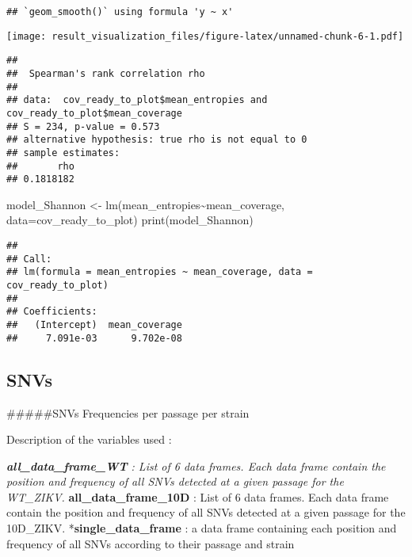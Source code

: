 \documentclass[
]{article}
\newenvironment{Shaded}{\begin{snugshade}}{\end{snugshade}}
\newcommand{\AttributeTok}[1]{\textcolor[rgb]{0.77,0.63,0.00}{#1}}
\newcommand{\FunctionTok}[1]{\textcolor[rgb]{0.00,0.00,0.00}{#1}}
\newcommand{\NormalTok}[1]{#1}
\newcommand{\OtherTok}[1]{\textcolor[rgb]{0.56,0.35,0.01}{#1}}
\newcommand{\SpecialCharTok}[1]{\textcolor[rgb]{0.00,0.00,0.00}{#1}}
\newcommand{\StringTok}[1]{\textcolor[rgb]{0.31,0.60,0.02}{#1}}
\begin{document}
\begin{verbatim}
## `geom_smooth()` using formula 'y ~ x'
\end{verbatim}

\texttt{[image: result\_visualization\_files/figure-latex/unnamed-chunk-6-1.pdf]}

\begin{Shaded}
\end{Shaded}

\begin{verbatim}
## 
##  Spearman's rank correlation rho
## 
## data:  cov_ready_to_plot$mean_entropies and cov_ready_to_plot$mean_coverage
## S = 234, p-value = 0.573
## alternative hypothesis: true rho is not equal to 0
## sample estimates:
##       rho 
## 0.1818182
\end{verbatim}

\begin{Shaded}
\begin{Highlighting}[]
\NormalTok{model\_Shannon }\OtherTok{\textless{}{-}} \FunctionTok{lm}\NormalTok{(mean\_entropies}\SpecialCharTok{\textasciitilde{}}\NormalTok{mean\_coverage, }\AttributeTok{data=}\NormalTok{cov\_ready\_to\_plot)}
\FunctionTok{print}\NormalTok{(model\_Shannon)}
\end{Highlighting}
\end{Shaded}

\begin{verbatim}
## 
## Call:
## lm(formula = mean_entropies ~ mean_coverage, data = cov_ready_to_plot)
## 
## Coefficients:
##   (Intercept)  mean_coverage  
##     7.091e-03      9.702e-08
\end{verbatim}

\hypertarget{snvs}{%
\subsection{SNVs}\label{snvs}}

\#\#\#\#\#SNVs Frequencies per passage per strain

Description of the variables used :

\emph{\textbf{all\_data\_frame\_WT} : List of 6 data frames. Each data
frame contain the position and frequency of all SNVs detected at a given
passage for the WT\_ZIKV. }\textbf{all\_data\_frame\_10D} : List of 6
data frames. Each data frame contain the position and frequency of all
SNVs detected at a given passage for the 10D\_ZIKV.
*\textbf{single\_data\_frame} : a data frame containing each position
and frequency of all SNVs according to their passage and strain
\end{document}
